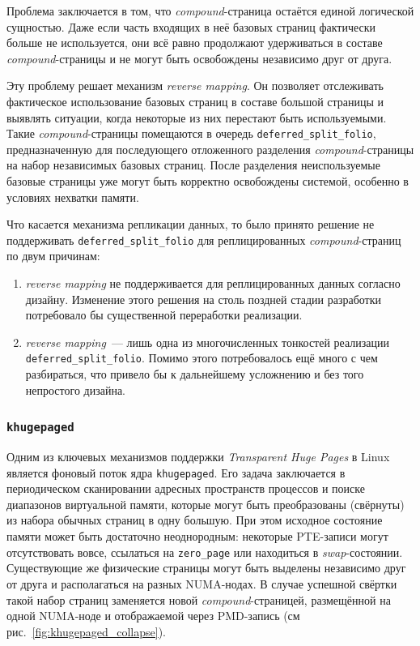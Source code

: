 Проблема заключается в том, что \textit{compound}-страница остаётся единой логической сущностью. Даже если часть входящих в неё базовых страниц фактически больше не используется, они всё равно продолжают удерживаться в составе \textit{compound}-страницы и не могут быть освобождены независимо друг от друга.

Эту проблему решает механизм \textit{reverse mapping}. Он позволяет отслеживать фактическое использование базовых страниц в составе большой страницы и выявлять ситуации, когда некоторые из них перестают быть используемыми. Такие \textit{compound}-страницы помещаются в очередь \texttt{deferred\_split\_folio}, предназначенную для последующего отложенного разделения \textit{compound}-страницы на набор независимых базовых страниц. После разделения неиспользуемые базовые страницы уже могут быть корректно освобождены системой, особенно в условиях нехватки памяти.

Что касается механизма репликации данных, то было принято решение не поддерживать \texttt{deferred\_split\_folio} для реплицированных \textit{compound}-страниц по двум причинам:
\begin{enumerate}
    \item \textit{reverse mapping} не поддерживается для реплицированных данных согласно дизайну. Изменение этого решения на столь поздней стадии разработки потребовало бы существенной переработки реализации.
    \item \textit{reverse mapping}~--- лишь одна из многочисленных тонкостей реализации \texttt{deferred\_split\_folio}. Помимо этого потребовалось ещё много с чем разбираться, что привело бы к дальнейшему усложнению и без того непростого дизайна.
\end{enumerate}

\subsubsection{\texttt{khugepaged}}

Одним из ключевых механизмов поддержки \textit{Transparent Huge Pages} в Linux является фоновый поток ядра \texttt{khugepaged}. Его задача заключается в периодическом сканировании адресных пространств процессов и поиске диапазонов виртуальной памяти, которые могут быть преобразованы (свёрнуты) из набора обычных страниц в одну большую.  При этом исходное состояние памяти может быть достаточно неоднородным: некоторые PTE-записи могут отсутствовать вовсе, ссылаться на \texttt{zero\_page} или находиться в \textit{swap}-состоянии. Существующие же физические страницы могут быть выделены независимо друг от друга и располагаться на разных NUMA-нодах. В случае успешной свёртки такой набор страниц заменяется новой \textit{compound}-страницей, размещённой на одной NUMA-ноде и отображаемой через PMD-запись (см рис.~\ref{fig:khugepaged_collapse}).

